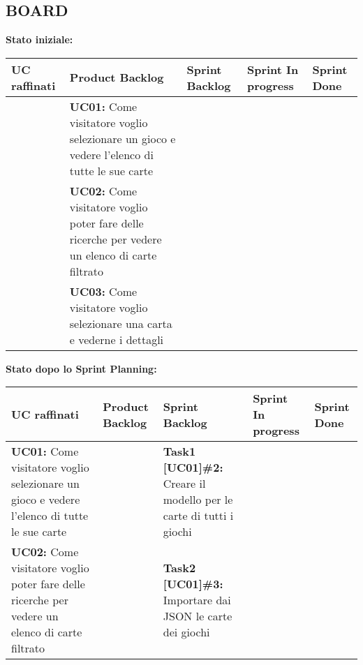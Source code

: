 \documentclass{article}
\begin{document}
    \newpage

    \subsection{BOARD}
    \begin{itemize}
        \newline
        \textbf{Stato iniziale:}
        \newline
        \newline
        \begin{tabular}{ | p{2.5cm} | p{4cm} | p{2.6cm} | p{1.6cm} | p{1.6cm} | }
            \hline
            \textbf{UC raffinati}
            & \textbf{Product Backlog}
            & \textbf{Sprint Backlog}
            & \textbf{Sprint In progress}
            & \textbf{Sprint Done} \\
            \hline
            & \textbf{UC01:} Come visitatore voglio selezionare un gioco e vedere l'elenco di tutte le sue carte & & & \\
            \hline
            & \textbf{UC02:} Come visitatore voglio poter fare delle ricerche per vedere un elenco di carte filtrato & & & \\
            \hline
            & \textbf{UC03:} Come visitatore voglio selezionare una carta e vederne i dettagli & & & \\
            \hline
        \end{tabular}
        \newpage
        \textbf{Stato dopo lo Sprint Planning:}
        \newline
        \newline
        \begin{tabular}{ | p{3.5cm} | p{1.5cm} | p{5cm} | p{1.6cm} | p{1.6cm} | }
            \hline
            \textbf{UC raffinati}
            & \textbf{Product Backlog}
            & \textbf{Sprint Backlog}
            & \textbf{Sprint In progress}
            & \textbf{Sprint Done} \\
            \hline
            \textbf{UC01:} Come visitatore voglio selezionare un gioco e vedere l'elenco di tutte le sue carte
            & & \textbf{Task1 [UC01]\#2:} Creare il modello per le carte di tutti i giochi                          & & \\
            \hline
            \textbf{UC02:} Come visitatore voglio poter fare delle ricerche per vedere un elenco di carte filtrato
            & & \textbf{Task2 [UC01]\#3:} Importare dai JSON le carte dei giochi                                    & & \\

\end{tabular}
\end{itemize}
\end{document}
